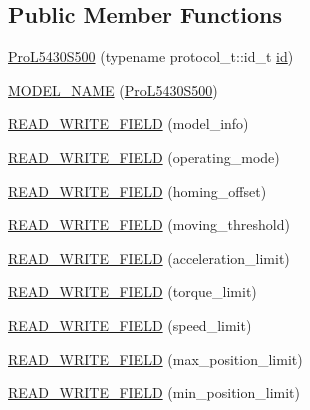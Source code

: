 \subsection*{Public Member Functions}
\begin{DoxyCompactItemize}
\item 
\hyperlink{classdynamixel_1_1servos_1_1_pro_l5430_s500_a56569e6572f13f72e644fa379c1e8949}{Pro\+L5430\+S500} (typename protocol\+\_\+t\+::id\+\_\+t \hyperlink{classdynamixel_1_1servos_1_1_servo_a2d022081672e25a7bb57b76706e1cc57}{id})
\item 
\hyperlink{classdynamixel_1_1servos_1_1_pro_l5430_s500_afc8971d8bbf06ad92ab092fe3a0eb975}{M\+O\+D\+E\+L\+\_\+\+N\+A\+M\+E} (\hyperlink{classdynamixel_1_1servos_1_1_pro_l5430_s500}{Pro\+L5430\+S500})
\item 
\hyperlink{classdynamixel_1_1servos_1_1_pro_l5430_s500_a96dc1a646262753c8dac0c3eb20557a2}{R\+E\+A\+D\+\_\+\+W\+R\+I\+T\+E\+\_\+\+F\+I\+E\+L\+D} (model\+\_\+info)
\item 
\hyperlink{classdynamixel_1_1servos_1_1_pro_l5430_s500_ae342547ca3ea1f1c1abf1c37cf5902e8}{R\+E\+A\+D\+\_\+\+W\+R\+I\+T\+E\+\_\+\+F\+I\+E\+L\+D} (operating\+\_\+mode)
\item 
\hyperlink{classdynamixel_1_1servos_1_1_pro_l5430_s500_a24039e822ce014472c671eb9e6086026}{R\+E\+A\+D\+\_\+\+W\+R\+I\+T\+E\+\_\+\+F\+I\+E\+L\+D} (homing\+\_\+offset)
\item 
\hyperlink{classdynamixel_1_1servos_1_1_pro_l5430_s500_a261ab053fd63cec68235549706f3189e}{R\+E\+A\+D\+\_\+\+W\+R\+I\+T\+E\+\_\+\+F\+I\+E\+L\+D} (moving\+\_\+threshold)
\item 
\hyperlink{classdynamixel_1_1servos_1_1_pro_l5430_s500_a1241009f2311c1e0c4854ee865de3086}{R\+E\+A\+D\+\_\+\+W\+R\+I\+T\+E\+\_\+\+F\+I\+E\+L\+D} (acceleration\+\_\+limit)
\item 
\hyperlink{classdynamixel_1_1servos_1_1_pro_l5430_s500_a2545c104ecea1fb52f07acae574fb2a3}{R\+E\+A\+D\+\_\+\+W\+R\+I\+T\+E\+\_\+\+F\+I\+E\+L\+D} (torque\+\_\+limit)
\item 
\hyperlink{classdynamixel_1_1servos_1_1_pro_l5430_s500_a46843b2792e307e7724e01c412e1f37c}{R\+E\+A\+D\+\_\+\+W\+R\+I\+T\+E\+\_\+\+F\+I\+E\+L\+D} (speed\+\_\+limit)
\item 
\hyperlink{classdynamixel_1_1servos_1_1_pro_l5430_s500_a8d813068cb6914d6c773590357c7ea7e}{R\+E\+A\+D\+\_\+\+W\+R\+I\+T\+E\+\_\+\+F\+I\+E\+L\+D} (max\+\_\+position\+\_\+limit)
\item 
\hyperlink{classdynamixel_1_1servos_1_1_pro_l5430_s500_ada9e56cfb52aa36e15dc3663645b7215}{R\+E\+A\+D\+\_\+\+W\+R\+I\+T\+E\+\_\+\+F\+I\+E\+L\+D} (min\+\_\+position\+\_\+limit)

\end{DoxyCompactItemize}
